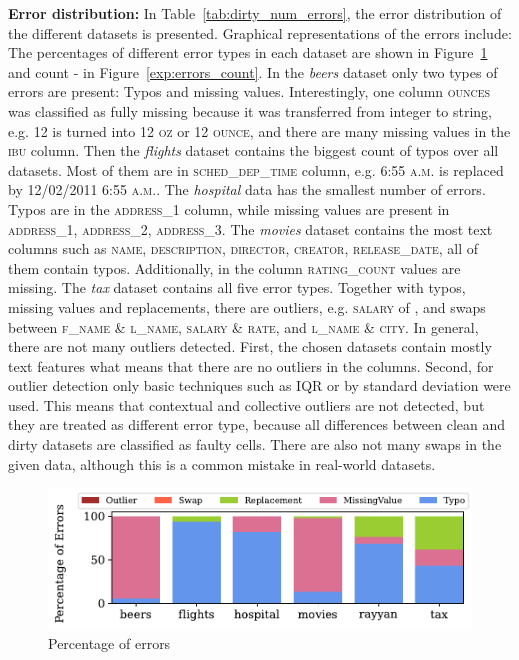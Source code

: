 \textbf{Error distribution: } 
In Table~\ref{tab:dirty_num_errors}, the error distribution of the different datasets is presented. 
Graphical representations of the errors include: The percentages of different error types in each dataset are shown in Figure~\ref{exp:errors_percent} and count - in Figure~\ref{exp:errors_count}.
In the \textit{beers} dataset only two types of errors are present: Typos and missing values. 
Interestingly, one column \textsc{ounces} was classified as fully missing because it was transferred from integer to string, e.g. \textsc{12} is turned into \textsc{12 oz} or \textsc{12 ounce}, and there are many missing values in the \textsc{ibu} column.
Then the \textit{flights} dataset contains the biggest count of typos over all  datasets. 
Most of them are in \textsc{sched\_dep\_time} column, e.g. \textsc{6:55 a.m.} is replaced by \textsc{12/02/2011 6:55 a.m.}.
The \textit{hospital} data has the smallest number of errors. 
Typos are in the \textsc{address\_1} column, while missing values are present in \textsc{address\_1}, \textsc{address\_2}, \textsc{address\_3}.
The \textit{movies} dataset contains the most text columns such as \textsc{name}, \textsc{description}, \textsc{director}, \textsc{creator}, \textsc{release\_date}, all of them contain typos. Additionally, in the column \textsc{rating\_count}  values are missing.
The \textit{tax} dataset contains all five error types. 
Together with typos, missing values and replacements, there are outliers, e.g. \textsc{salary} of , and swaps between \textsc{f\_name} \& \textsc{l\_name}, \textsc{salary} \& \textsc{rate}, and \textsc{l\_name} \& \textsc{city}. 
In general, there are not many outliers detected.
First, the chosen datasets contain mostly text features what means that there are no outliers in the columns.
Second, for outlier detection only basic techniques such as IQR or by standard deviation were used. 
This means that contextual and collective outliers are not detected, but they are treated as different error type, because all differences between clean and dirty datasets are classified as faulty cells.
There are also not many swaps in the given data, although this is a common mistake in real-world datasets.

\begin{figure}[!t]
    \centering
    \includegraphics[width=\textwidth]{figures/plot/error_percent/errors_percent.pdf}
    \caption{Percentage of errors}
    \label{exp:errors_percent}
\end{figure}

